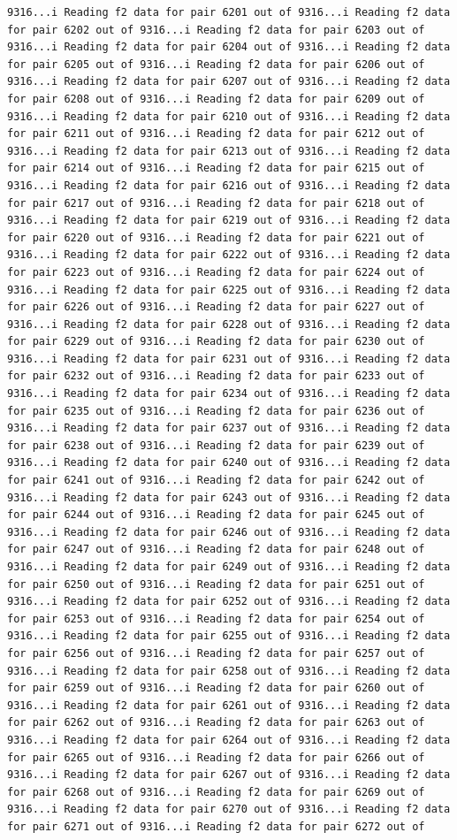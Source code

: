 \documentclass[
]{article}
\begin{document}
\begin{verbatim}
9316...i Reading f2 data for pair 6201 out of 9316...i Reading f2 data for pair 6202 out of 9316...i Reading f2 data for pair 6203 out of 9316...i Reading f2 data for pair 6204 out of 9316...i Reading f2 data for pair 6205 out of 9316...i Reading f2 data for pair 6206 out of 9316...i Reading f2 data for pair 6207 out of 9316...i Reading f2 data for pair 6208 out of 9316...i Reading f2 data for pair 6209 out of 9316...i Reading f2 data for pair 6210 out of 9316...i Reading f2 data for pair 6211 out of 9316...i Reading f2 data for pair 6212 out of 9316...i Reading f2 data for pair 6213 out of 9316...i Reading f2 data for pair 6214 out of 9316...i Reading f2 data for pair 6215 out of 9316...i Reading f2 data for pair 6216 out of 9316...i Reading f2 data for pair 6217 out of 9316...i Reading f2 data for pair 6218 out of 9316...i Reading f2 data for pair 6219 out of 9316...i Reading f2 data for pair 6220 out of 9316...i Reading f2 data for pair 6221 out of 9316...i Reading f2 data for pair 6222 out of 9316...i Reading f2 data for pair 6223 out of 9316...i Reading f2 data for pair 6224 out of 9316...i Reading f2 data for pair 6225 out of 9316...i Reading f2 data for pair 6226 out of 9316...i Reading f2 data for pair 6227 out of 9316...i Reading f2 data for pair 6228 out of 9316...i Reading f2 data for pair 6229 out of 9316...i Reading f2 data for pair 6230 out of 9316...i Reading f2 data for pair 6231 out of 9316...i Reading f2 data for pair 6232 out of 9316...i Reading f2 data for pair 6233 out of 9316...i Reading f2 data for pair 6234 out of 9316...i Reading f2 data for pair 6235 out of 9316...i Reading f2 data for pair 6236 out of 9316...i Reading f2 data for pair 6237 out of 9316...i Reading f2 data for pair 6238 out of 9316...i Reading f2 data for pair 6239 out of 9316...i Reading f2 data for pair 6240 out of 9316...i Reading f2 data for pair 6241 out of 9316...i Reading f2 data for pair 6242 out of 9316...i Reading f2 data for pair 6243 out of 9316...i Reading f2 data for pair 6244 out of 9316...i Reading f2 data for pair 6245 out of 9316...i Reading f2 data for pair 6246 out of 9316...i Reading f2 data for pair 6247 out of 9316...i Reading f2 data for pair 6248 out of 9316...i Reading f2 data for pair 6249 out of 9316...i Reading f2 data for pair 6250 out of 9316...i Reading f2 data for pair 6251 out of 9316...i Reading f2 data for pair 6252 out of 9316...i Reading f2 data for pair 6253 out of 9316...i Reading f2 data for pair 6254 out of 9316...i Reading f2 data for pair 6255 out of 9316...i Reading f2 data for pair 6256 out of 9316...i Reading f2 data for pair 6257 out of 9316...i Reading f2 data for pair 6258 out of 9316...i Reading f2 data for pair 6259 out of 9316...i Reading f2 data for pair 6260 out of 9316...i Reading f2 data for pair 6261 out of 9316...i Reading f2 data for pair 6262 out of 9316...i Reading f2 data for pair 6263 out of 9316...i Reading f2 data for pair 6264 out of 9316...i Reading f2 data for pair 6265 out of 9316...i Reading f2 data for pair 6266 out of 9316...i Reading f2 data for pair 6267 out of 9316...i Reading f2 data for pair 6268 out of 9316...i Reading f2 data for pair 6269 out of 9316...i Reading f2 data for pair 6270 out of 9316...i Reading f2 data for pair 6271 out of 9316...i Reading f2 data for pair 6272 out of 
\end{verbatim}
\end{document}
